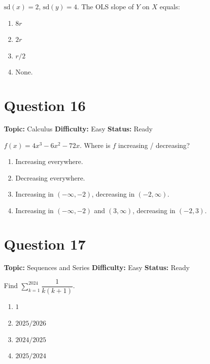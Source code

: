 \documentclass[11pt]{article}
\begin{document}
$\mathrm{sd}(x) = 2$, $\mathrm{sd}(y) = 4$. The OLS slope of $Y$ on $X$ equals:
\begin{enumerate}[label=(\Alph*)]
\item $8 r$ \item $2r$ \item $r/2$ \item None.
\end{enumerate}

\newpage

\section*{Question 16}


\noindent\textbf{Topic:} Calculus \quad \textbf{Difficulty:} Easy \quad \textbf{Status:} Ready



$f(x) = 4x^3 - 6x^2 - 72x$. Where is $f$ increasing / decreasing?
\begin{enumerate}[label=(\Alph*)]
\item Increasing everywhere.
\item Decreasing everywhere.
\item Increasing in $(-\infty,-2)$, decreasing in $(-2,\infty)$.
\item Increasing in $(-\infty,-2)$ and $(3,\infty)$, decreasing in $(-2,3)$.
\end{enumerate}

\newpage

\section*{Question 17}


\noindent\textbf{Topic:} Sequences and Series \quad \textbf{Difficulty:} Easy \quad \textbf{Status:} Ready



Find $\sum_{k=1}^{2024}\dfrac{1}{k(k+1)}$.
\begin{enumerate}[label=(\Alph*)]
\item $1$ \item $2025/2026$ \item $2024/2025$ \item $2025/2024$
\end{enumerate}

\newpage
\end{document}
